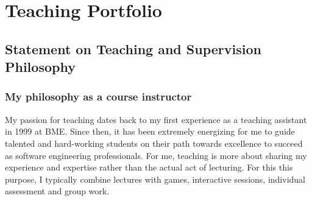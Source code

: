 \chapter{Teaching Portfolio}
\label{sec:teaching-portfolio}

%


\section{Statement on Teaching and Supervision Philosophy}

\subsection{My philosophy as a course instructor}

My passion for teaching dates back to my first experience as a teaching assistant in 1999 at BME. Since then, it has been 
extremely energizing for me to guide talented and hard-working students on their path towards excellence to succeed as 
software engineering professionals. For me, teaching is more about sharing my experience and expertise rather than the 
actual act of lecturing. For this this purpose, I typically combine lectures with games, interactive sessions, individual 
assessment and group work. 

